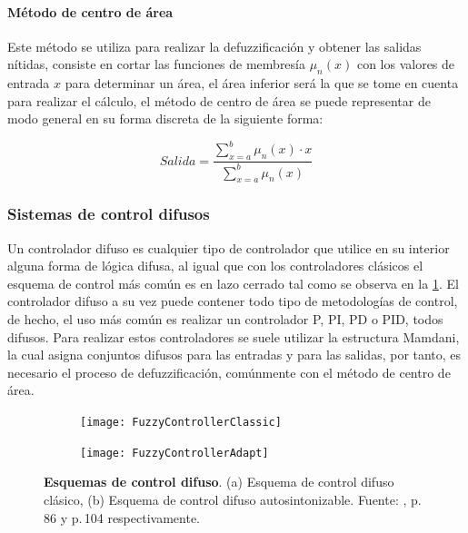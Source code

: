 			\paragraph{Método de centro de área}

				Este método se utiliza para realizar la defuzzificación y obtener las salidas nítidas, consiste en cortar las funciones de membresía $\mu_{n}(x)$ con los valores de entrada $x$ para determinar un área, el área inferior será la que se tome en cuenta para realizar el cálculo, el método de centro de área se puede representar de modo general en su forma discreta de la siguiente forma:
				
				\begin{equation}\label{eq:Centroide}
					Salida = \frac{\displaystyle\sum\limits_{x=a}^{b}\mu_{n}(x)\cdot x}{\displaystyle\sum\limits_{x=a}^{b}\mu_{n}(x)}
				\end{equation}
	
		\subsubsection{Sistemas de control difusos}
			
			Un controlador difuso es cualquier tipo de controlador que utilice en su interior alguna forma de lógica difusa, al igual que con los controladores clásicos el esquema de control más común es en lazo cerrado tal como se observa en la \cref{fig:fuzzycontrollerclassic}. El controlador difuso a su vez puede contener todo tipo de metodologías de control, de hecho, el uso más común es realizar un controlador P, PI, PD o PID, todos difusos. Para realizar estos controladores se suele utilizar la estructura Mamdani, la cual asigna conjuntos difusos para las entradas y para las salidas, por tanto, es necesario el proceso de defuzzificación, comúnmente con el método de centro de área.
					
			\begin{figure}[htb]
				\centering
				\begin{subfigure}[t]{0.8\textwidth}
					\centering
					\texttt{[image: FuzzyControllerClassic]} %
					\caption{} 
					\label{fig:fuzzycontrollerclassic}
				\end{subfigure}
				\hfill
				\begin{subfigure}[t]{0.8\textwidth}
					\centering
					\texttt{[image: FuzzyControllerAdapt]} %
					\caption{}
					\label{fig:fuzzycontrolleradapt}
				\end{subfigure}
				
				\caption[Esquemas de control difuso]{\textbf{Esquemas de control difuso}. (a) Esquema de control difuso clásico, (b) Esquema de control difuso autosintonizable. Fuente: \textcite{cruz2010inteligencia}, p.$\,$86 y p.$\,$104 respectivamente. \label{fig:FuzzySchems}}
			\end{figure}
			
